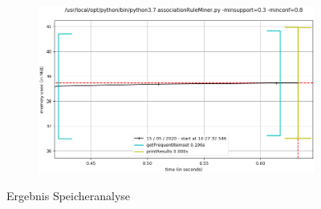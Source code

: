 \begin{figure}[htb]
\begin{center}
\begin{subfigure}{0.47\textwidth}
		\caption{}
		\label{subfig:0301}
	\end{subfigure}\qquad
	\begin{subfigure}{0.47\textwidth}
		\includegraphics[width=\textwidth]{bilder/ass-conf-0308.png}
		\caption{}
		\label{subfig:0308}
	\end{subfigure}
\end{center}
\caption{Ergebnis Speicheranalyse}
\label{fig:result-mem-analysis}
\end{figure}
